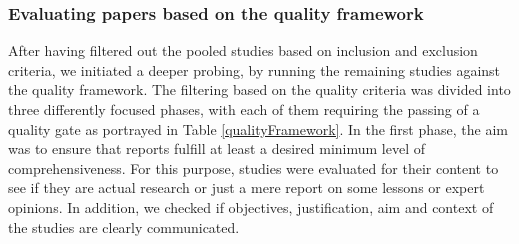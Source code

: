 \documentclass{bmcart}
\begin{document}





\subsubsection{Evaluating papers based on the quality framework}

After having filtered out the pooled studies based on inclusion and exclusion criteria, we initiated a deeper probing, by running the remaining studies against the quality framework. The filtering based on the quality criteria was divided into three differently focused phases, with each of them requiring the passing of a quality gate as portrayed in Table \ref{qualityFramework}. In the first phase, the aim was to ensure that reports fulfill at least a desired minimum level of comprehensiveness. For this purpose, studies were evaluated for their content to see if they are actual research or just a mere report on some lessons or expert opinions. In addition, we checked if objectives, justification, aim and context of the studies are clearly communicated.
\end{document}
